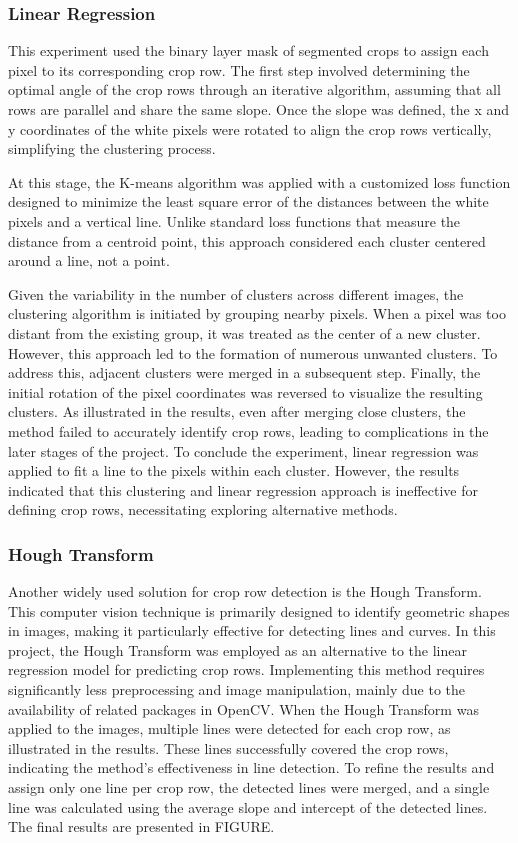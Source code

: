 \documentclass[conference]{IEEEtran}
\begin{document}
\subsubsection{Linear Regression}
This experiment used the binary layer mask of segmented crops to assign each pixel to its corresponding crop row. The first step involved determining the optimal angle of the crop rows through an iterative algorithm, assuming that all rows are parallel and share the same slope. Once the slope was defined, the x and y coordinates of the white pixels were rotated to align the crop rows vertically, simplifying the clustering process.

At this stage, the K-means algorithm was applied with a customized loss function designed to minimize the least square error of the distances between the white pixels and a vertical line. Unlike standard loss functions that measure the distance from a centroid point, this approach considered each cluster centered around a line, not a point.

Given the variability in the number of clusters across different images, the clustering algorithm is initiated by grouping nearby pixels. When a pixel was too distant from the existing group, it was treated as the center of a new cluster. However, this approach led to the formation of numerous unwanted clusters. To address this, adjacent clusters were merged in a subsequent step. Finally, the initial rotation of the pixel coordinates was reversed to visualize the resulting clusters. As illustrated in the results, even after merging close clusters, the method failed to accurately identify crop rows, leading to complications in the later stages of the project. To conclude the experiment, linear regression was applied to fit a line to the pixels within each cluster. However, the results indicated that this clustering and linear regression approach is ineffective for defining crop rows, necessitating exploring alternative methods.

\subsubsection{Hough Transform}
Another widely used solution for crop row detection is the Hough Transform. This computer vision technique is primarily designed to identify geometric shapes in images, making it particularly effective for detecting lines and curves. In this project, the Hough Transform was employed as an alternative to the linear regression model for predicting crop rows. Implementing this method requires significantly less preprocessing and image manipulation, mainly due to the availability of related packages in OpenCV. When the Hough Transform was applied to the images, multiple lines were detected for each crop row, as illustrated in the results. These lines successfully covered the crop rows, indicating the method's effectiveness in line detection. To refine the results and assign only one line per crop row, the detected lines were merged, and a single line was calculated using the average slope and intercept of the detected lines. The final results are presented in FIGURE.
\end{document}
